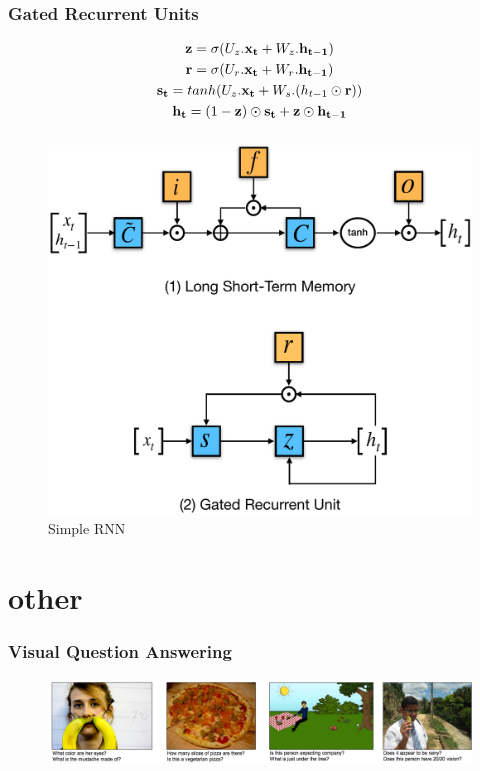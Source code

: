 \documentclass[presentation]{beamer}
\begin{document}
\begin{frame}
    \frametitle{Gated Recurrent Units}

    \begin{gather}
        {\bf z} = \sigma(U_z . {\bf x_t} + W_z . {\bf h_{t-1}})\\
        {\bf r} = \sigma(U_r . {\bf x_t} + W_r . {\bf h_{t-1}})\\
        {\bf s_t} = tanh(U_z . {\bf x_t} + W_s .( h_{t-1} \odot {\bf r}) )\\
        {\bf h_t} = (1 - {\bf z}) \odot {\bf s_t} + {\bf z} \odot {\bf h_{t-1}} 
    \end{gather}

\end{frame}

\begin{frame}
    \frametitle{}

    \begin{figure}
        \centering
        \includegraphics[width=.7\linewidth]{LSTMGRU.pdf}
        \caption{Simple RNN}
    \end{figure}

\end{frame}

\section{other}

\begin{frame}
    \frametitle{Visual Question Answering}
    \begin{figure}
        \centering
        \includegraphics[width=\linewidth]{vqa.jpg}
    \end{figure}
\end{frame}
\end{document}
